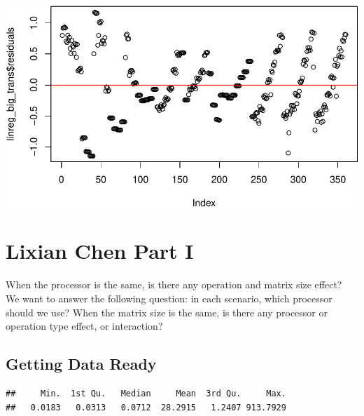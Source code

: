 \documentclass[
]{article}
\newenvironment{Shaded}{\begin{snugshade}}{\end{snugshade}}
\newcommand{\CommentTok}[1]{\textcolor[rgb]{0.56,0.35,0.01}{\textit{#1}}}
\newcommand{\DataTypeTok}[1]{\textcolor[rgb]{0.13,0.29,0.53}{#1}}
\newcommand{\KeywordTok}[1]{\textcolor[rgb]{0.13,0.29,0.53}{\textbf{#1}}}
\newcommand{\NormalTok}[1]{#1}
\newcommand{\OperatorTok}[1]{\textcolor[rgb]{0.81,0.36,0.00}{\textbf{#1}}}
\newcommand{\OtherTok}[1]{\textcolor[rgb]{0.56,0.35,0.01}{#1}}
\newcommand{\StringTok}[1]{\textcolor[rgb]{0.31,0.60,0.02}{#1}}
\begin{document}
\includegraphics{main_files/figure-latex/unnamed-chunk-22-3.pdf}

\hypertarget{lixian-chen-part-i}{%
\section{Lixian Chen Part I}\label{lixian-chen-part-i}}

When the processor is the same, is there any operation and matrix size
effect? We want to answer the following question: in each scenario,
which processor should we use? When the matrix size is the same, is
there any processor or operation type effect, or interaction?

\hypertarget{getting-data-ready}{%
\subsection{Getting Data Ready}\label{getting-data-ready}}

\begin{Shaded}
\end{Shaded}

\begin{verbatim}
##     Min.  1st Qu.   Median     Mean  3rd Qu.     Max. 
##   0.0183   0.0313   0.0712  28.2915   1.2407 913.7929
\end{verbatim}
\end{document}
